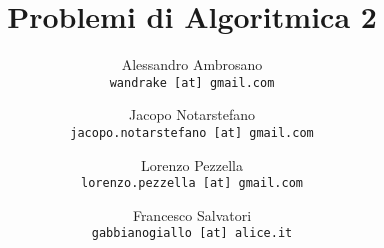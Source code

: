\documentclass[a4paper, 12pt]{report}
\theoremstyle{plain}
\begin{document}
    \title{Problemi di Algoritmica 2}
    \author{
        Alessandro Ambrosano\\
        \texttt{wandrake [at] gmail.com}
        \and
        Jacopo Notarstefano\\
        \texttt{jacopo.notarstefano [at] gmail.com}
        \and
        Lorenzo Pezzella\\
        \texttt{lorenzo.pezzella [at] gmail.com}
        \and
        Francesco Salvatori\\
        \texttt{gabbianogiallo [at] alice.it}
    }
    
    \maketitle

    
    
    
     
    
    
    
    
    
    
    
    
    
    
    
    
    
    
    
    
    
    
    
\end{document}
